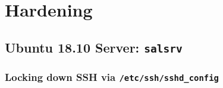 \section{Hardening}

\subsection{Ubuntu 18.10 Server: \texttt{salsrv}}
%
%
%
%
\subsubsection{Locking down SSH via \texttt{/etc/ssh/sshd\_config}}


